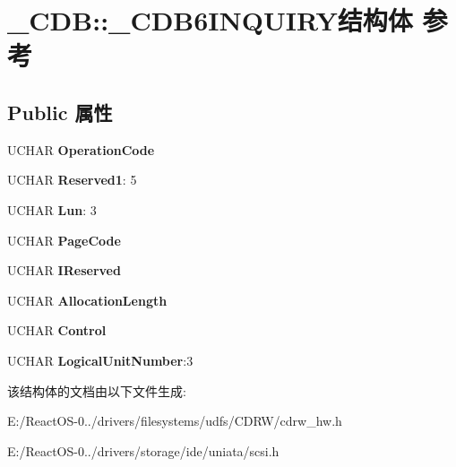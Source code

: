 \hypertarget{struct___c_d_b_1_1___c_d_b6_i_n_q_u_i_r_y}{}\section{\+\_\+\+C\+DB\+:\+:\+\_\+\+C\+D\+B6\+I\+N\+Q\+U\+I\+R\+Y结构体 参考}
\label{struct___c_d_b_1_1___c_d_b6_i_n_q_u_i_r_y}
\subsection*{Public 属性}
\begin{DoxyCompactItemize}
\item 
\mbox{\label{struct___c_d_b_1_1___c_d_b6_i_n_q_u_i_r_y_a3aa60a00a94d6af6d2463dfa858f2b8c}} 
U\+C\+H\+AR {\bfseries Operation\+Code}
\item 
\mbox{\label{struct___c_d_b_1_1___c_d_b6_i_n_q_u_i_r_y_a5b588d9b3d172faf509a3c3aee0659b4}} 
U\+C\+H\+AR {\bfseries Reserved1}\+: 5
\item 
\mbox{\label{struct___c_d_b_1_1___c_d_b6_i_n_q_u_i_r_y_adb5f5e0af8287471b8130213f56f5bff}} 
U\+C\+H\+AR {\bfseries Lun}\+: 3
\item 
\mbox{\label{struct___c_d_b_1_1___c_d_b6_i_n_q_u_i_r_y_a4e382e2640812e914257c698d55f0539}} 
U\+C\+H\+AR {\bfseries Page\+Code}
\item 
\mbox{\label{struct___c_d_b_1_1___c_d_b6_i_n_q_u_i_r_y_a124ed78ed5efd46ab1d704d55be25a3d}} 
U\+C\+H\+AR {\bfseries I\+Reserved}
\item 
\mbox{\label{struct___c_d_b_1_1___c_d_b6_i_n_q_u_i_r_y_a33818e63ae60e474c1be3b23876fa3e5}} 
U\+C\+H\+AR {\bfseries Allocation\+Length}
\item 
\mbox{\label{struct___c_d_b_1_1___c_d_b6_i_n_q_u_i_r_y_a54baba3c6488d3d9dc41816d1cd4d25f}} 
U\+C\+H\+AR {\bfseries Control}
\item 
\mbox{\label{struct___c_d_b_1_1___c_d_b6_i_n_q_u_i_r_y_a2e20af5ede874572c34710ad9623dc75}} 
U\+C\+H\+AR {\bfseries Logical\+Unit\+Number}\+:3
\end{DoxyCompactItemize}


该结构体的文档由以下文件生成\+:\begin{DoxyCompactItemize}
\item 
E\+:/\+React\+O\+S-\/0../drivers/filesystems/udfs/\+C\+D\+R\+W/cdrw\+\_\+hw.\+h\item 
E\+:/\+React\+O\+S-\/0../drivers/storage/ide/uniata/scsi.\+h\end{DoxyCompactItemize}
